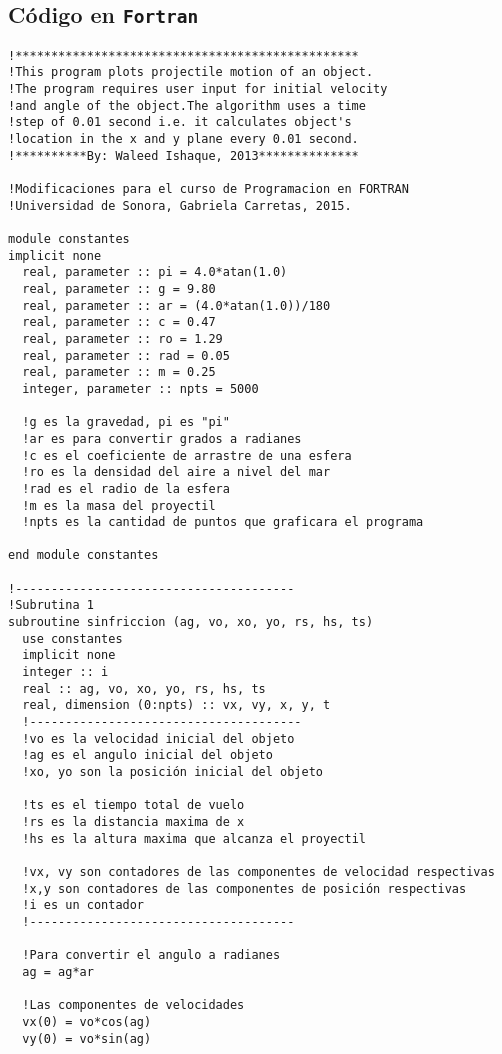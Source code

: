 \documentclass[a4paper]{article}
\begin{document}
  \subsection{Código en \texttt{Fortran}}
\begin{verbatim}
!************************************************  
!This program plots projectile motion of an object.  
!The program requires user input for initial velocity   
!and angle of the object.The algorithm uses a time   
!step of 0.01 second i.e. it calculates object's  
!location in the x and y plane every 0.01 second.  
!**********By: Waleed Ishaque, 2013**************

!Modificaciones para el curso de Programacion en FORTRAN
!Universidad de Sonora, Gabriela Carretas, 2015.

module constantes
implicit none
  real, parameter :: pi = 4.0*atan(1.0)
  real, parameter :: g = 9.80
  real, parameter :: ar = (4.0*atan(1.0))/180 
  real, parameter :: c = 0.47
  real, parameter :: ro = 1.29
  real, parameter :: rad = 0.05
  real, parameter :: m = 0.25
  integer, parameter :: npts = 5000

  !g es la gravedad, pi es "pi"
  !ar es para convertir grados a radianes
  !c es el coeficiente de arrastre de una esfera
  !ro es la densidad del aire a nivel del mar
  !rad es el radio de la esfera
  !m es la masa del proyectil
  !npts es la cantidad de puntos que graficara el programa

end module constantes

!---------------------------------------
!Subrutina 1
subroutine sinfriccion (ag, vo, xo, yo, rs, hs, ts)
  use constantes
  implicit none
  integer :: i
  real :: ag, vo, xo, yo, rs, hs, ts
  real, dimension (0:npts) :: vx, vy, x, y, t  
  !--------------------------------------
  !vo es la velocidad inicial del objeto   
  !ag es el angulo inicial del objeto
  !xo, yo son la posición inicial del objeto
 
  !ts es el tiempo total de vuelo
  !rs es la distancia maxima de x
  !hs es la altura maxima que alcanza el proyectil

  !vx, vy son contadores de las componentes de velocidad respectivas
  !x,y son contadores de las componentes de posición respectivas
  !i es un contador
  !-------------------------------------

  !Para convertir el angulo a radianes   
  ag = ag*ar

  !Las componentes de velocidades
  vx(0) = vo*cos(ag)
  vy(0) = vo*sin(ag)


\end{verbatim}
\end{document}
